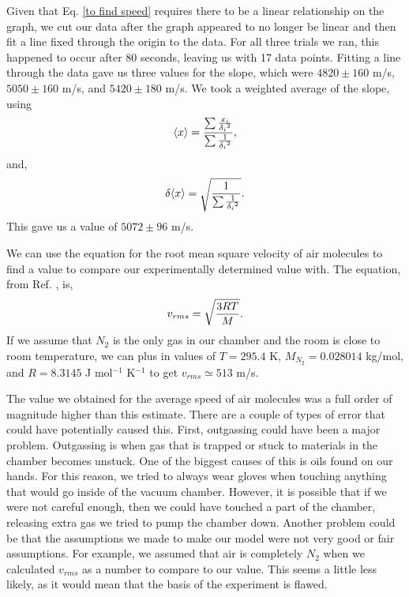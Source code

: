 \documentclass[11pt,letterpaper]{article}
\begin{document}
Given that Eq. \eqref{to find speed} requires there to be a linear relationship on the graph, we cut our data after the graph appeared to no longer be linear and then fit a line fixed through the origin to the data. For all three trials we ran, this happened to occur after 80 seconds, leaving us with 17 data points. Fitting a line through the data gave us three values for the slope, which were $4820 \pm 160$ m/s, $5050 \pm 160$ m/s, and $5420 \pm 180$ m/s. We took a weighted average of the slope, using
\begin{equation}
    \langle x \rangle = {\sum {x_i \over {\delta_i}^2} \over \sum {1 \over {\delta_i}^2}} ,
\end{equation}
and,
\begin{equation}
    \delta \langle x \rangle = \sqrt{{1 \over \sum {1 \over {\delta_i}^2}}} .
\end{equation}
This gave us a value of $5072 \pm 96$ m/s.

We can use the equation for the root mean square velocity of air molecules to find a value to compare our experimentally determined value with. The equation, from Ref. \cite{Halliday}, is,
\begin{equation}
    v_{rms} = \sqrt{{3 R T \over M}} .
\end{equation}
If we assume that $N_2$ is the only gas in our chamber and the room is close to room temperature, we can plus in values of $T = 295.4$ K, $M_{N_2} = 0.028014$ kg/mol, and $R = 8.3145$ J mol$^{-1}$ K$^{-1}$ to get $v_{rms} \simeq 513$ m/s.

The value we obtained for the average speed of air molecules was a full order of magnitude higher than this estimate. There are a couple of types of error that could have potentially caused this. First, outgassing could have been a major problem. Outgassing is when gas that is trapped or stuck to materials in the chamber becomes unstuck. One of the biggest causes of this is oils found on our hands. For this reason, we tried to always wear gloves when touching anything that would go inside of the vacuum chamber. However, it is possible that if we were not careful enough, then we could have touched a part of the chamber, releasing extra gas we tried to pump the chamber down. Another problem could be that the assumptions we made to make our model were not very good or fair assumptions. For example, we assumed that air is completely $N_2$ when we calculated $v_{rms}$ as a number to compare to our value. This seems a little less likely, as it would mean that the basis of the experiment is flawed.
\end{document}
